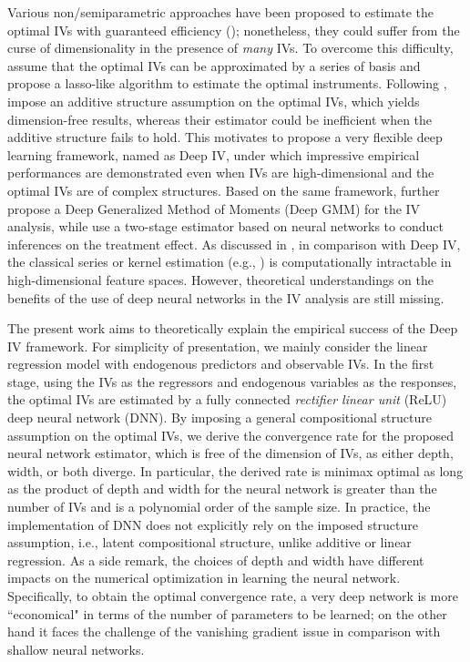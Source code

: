 \documentclass[11pt, preprint]{imsart}
\numberwithin{equation}{section}
\theoremstyle{plain}
\theoremstyle{definition}
\begin{document}
Various non/semiparametric approaches have been proposed to estimate the optimal IVs with guaranteed efficiency (\citealp{a74,n90,npv99,np03}); nonetheless, they could suffer from the curse of dimensionality in the presence of {\em many} IVs. To overcome this difficulty, \cite{bcch12} assume that the optimal IVs can be approximated by a series of basis and propose a lasso-like algorithm to estimate the optimal instruments. Following \cite{bcch12}, \cite{fz18} impose an additive structure assumption on the optimal IVs, which yields dimension-free results, whereas their estimator could be inefficient when the additive structure fails to hold. This motivates \cite{hllt17} to propose a very flexible deep learning framework, named as Deep IV, under which impressive empirical performances are demonstrated even when IVs are high-dimensional and the optimal IVs are of complex structures. Based on the same framework, \cite{bennett2019deep} further propose a Deep Generalized Method of Moments (Deep GMM) for the IV analysis, {while \cite{flm18} use a two-stage estimator based on neural networks to conduct inferences on the treatment effect.} As discussed in \cite{hllt17}, in comparison with Deep IV, the classical series or kernel estimation (e.g., \citealp{np03, bck07, cp12, bcch12}) is computationally intractable in high-dimensional feature spaces. However, theoretical understandings on the benefits of the use of deep neural networks in the IV analysis are still missing. 

{The present work aims to theoretically explain the empirical success of  the Deep IV framework.} For simplicity of presentation, we mainly consider the linear regression model with endogenous predictors and observable IVs. In the first stage, using the IVs as the regressors and endogenous variables as the responses, the optimal IVs are estimated by a fully connected \textit{rectifier linear unit} (ReLU) deep neural network (DNN). By imposing a general compositional structure assumption on the optimal IVs, we derive the convergence rate for the proposed neural network estimator, which is free of the dimension of IVs, as either depth, width, or both diverge. In particular, the derived rate is minimax optimal as long as the product of depth and width for the neural network is greater than the number of IVs and is a polynomial order of the sample size. In practice, the implementation of DNN does not explicitly rely on the imposed structure assumption, i.e., latent compositional structure, unlike additive {or linear} regression. As a side remark, the choices of depth and width have different impacts on the numerical optimization in learning the neural network. Specifically, to obtain the optimal convergence rate, a very deep network is more ``economical" in terms of the number of parameters to be learned; on the other hand it faces the challenge of the vanishing gradient issue in comparison with shallow neural networks.
\end{document}
